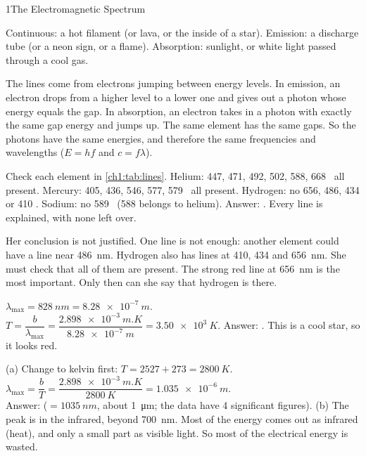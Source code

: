 \begin{chapteranswers}{1}{The Electromagnetic Spectrum}
\item Continuous: a hot filament (or lava, or the inside of a star). Emission: a discharge tube
  (or a neon sign, or a flame). Absorption: sunlight, or white light passed through a cool gas.

\item The lines come from electrons jumping between energy levels. In emission, an electron
  drops from a higher level to a lower one and gives out a photon whose energy equals the gap.
  In absorption, an electron takes in a photon with exactly the same gap energy and jumps up.
  The same element has the same gaps. So the photons have the same energies, and therefore the
  same frequencies and wavelengths ($E = hf$ and $c = f\lambda$).

\item Check each element in \cref{ch1:tab:lines}. Helium: 447, 471, 492, 502, 588, 668 \cmark\
  all present. Mercury: 405, 436, 546, 577, 579 \cmark\ all present. Hydrogen: no 656, 486, 434
  or 410 \xmark. Sodium: no 589 \xmark\ (588 belongs to helium).
  Answer: \final{helium and mercury}. Every line is explained, with none left over.

\item Her conclusion is not justified. One line is not enough: another element could have a line
  near \qty{486}{nm}. Hydrogen also has lines at 410, 434 and \qty{656}{nm}. She must check that
  all of them are present. The strong red line at \qty{656}{nm} is the most important. Only then
  can she say that hydrogen is there.

\item $\lambda_\mathrm{max} = \qty{828}{nm} = \qty{8.28e-7}{m}$.
  $T = \dfrac{b}{\lambda_\mathrm{max}} = \dfrac{\qty{2.898e-3}{m.K}}{\qty{8.28e-7}{m}}
  = \qty{3.50e3}{K}$. Answer: \final{$T = \qty{3.50e3}{K}$}. This is a cool star, so it looks
  red.

\item (a) Change to kelvin first: $T = 2527 + 273 = \qty{2800}{K}$.
  $\lambda_\mathrm{max} = \dfrac{b}{T} = \dfrac{\qty{2.898e-3}{m.K}}{\qty{2800}{K}}
  = \qty{1.035e-6}{m}$.\\[4pt]
  Answer: 
  ($=\qty{1035}{nm}$, about \qty{1}{\micro\metre}; the data have 4 significant figures). (b) The peak is in the infrared, beyond \qty{700}{nm}. Most of the energy
  comes out as infrared (heat), and only a small part as visible light. So most of the
  electrical energy is wasted.


\end{chapteranswers}

